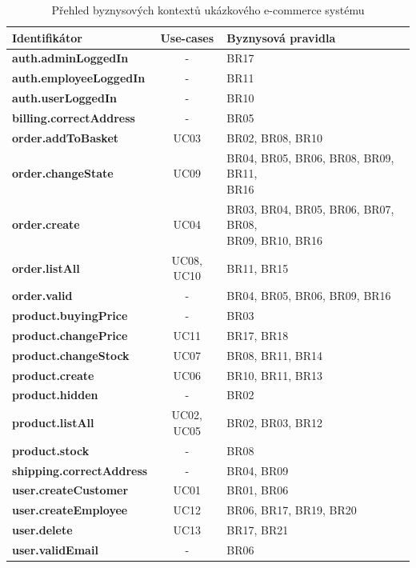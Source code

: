 \begin{table}
    \centering
    \begin{tabular*}{\textwidth}{ l c l }
        \hline
        \textbf{Identifikátor} & \textbf{Use-cases} & \textbf{Byznysová pravidla} \\ \hline \hline
        \textbf{auth.adminLoggedIn} & - & BR17 \\ \hline
        \textbf{auth.employeeLoggedIn} & - & BR11 \\ \hline
        \textbf{auth.userLoggedIn} & - & BR10 \\ \hline
        \textbf{billing.correctAddress} & - & BR05 \\ \hline
        \textbf{order.addToBasket} & UC03 & BR02, BR08, BR10 \\ \hline
        \textbf{order.changeState} & UC09 & \makecell[l]{BR04, BR05, BR06, BR08, BR09, BR11, \\ BR16} \\ \hline
        \textbf{order.create} & UC04 & \makecell[l]{BR03, BR04, BR05, BR06, BR07, BR08, \\ BR09, BR10, BR16} \\ \hline
        \textbf{order.listAll} & UC08, UC10 & BR11, BR15 \\ \hline
        \textbf{order.valid} & - & BR04, BR05, BR06, BR09, BR16 \\ \hline
        \textbf{product.buyingPrice} & - & BR03 \\ \hline
        \textbf{product.changePrice} & UC11 & BR17, BR18 \\ \hline
        \textbf{product.changeStock} & UC07 & BR08, BR11, BR14 \\ \hline
        \textbf{product.create} & UC06 & BR10, BR11, BR13 \\ \hline
        \textbf{product.hidden} & - & BR02 \\ \hline
        \textbf{product.listAll} & UC02, UC05 & BR02, BR03, BR12 \\ \hline
        \textbf{product.stock} & - & BR08 \\ \hline
        \textbf{shipping.correctAddress} & - & BR04, BR09 \\ \hline
        \textbf{user.createCustomer} & UC01 & BR01, BR06 \\ \hline
        \textbf{user.createEmployee} & UC12 & BR06, BR17, BR19, BR20 \\ \hline
        \textbf{user.delete} & UC13 & BR17, BR21 \\ \hline
        \textbf{user.validEmail} & - & BR06 \\ \hline
        \hline
    \end{tabular*}
    \caption{Přehled byznysov\'ych kontextů ukázkového e-commerce systému}
    \label{tbl:business-contexts}
\end{table}

